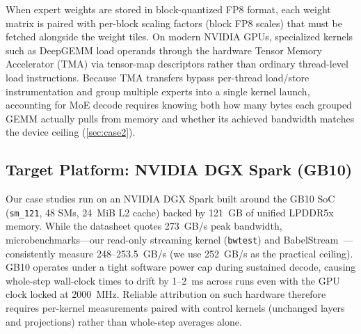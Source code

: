 When expert weights are stored in block-quantized FP8 format, each weight matrix is paired
with per-block scaling factors (block FP8 scales) that must be fetched alongside the weight
tiles.
On modern NVIDIA GPUs, specialized kernels such as DeepGEMM load operands through the
hardware Tensor Memory Accelerator (TMA) via tensor-map descriptors rather than ordinary
thread-level load instructions.
Because TMA transfers bypass per-thread load/store instrumentation and group multiple
experts into a single kernel launch, accounting for MoE decode requires knowing both how
many bytes each grouped GEMM actually pulls from memory and whether its achieved bandwidth
matches the device ceiling (\cref{sec:case2}).

\subsection{Target Platform: NVIDIA DGX Spark (GB10)}

Our case studies run on an NVIDIA DGX Spark built around the GB10 SoC
(\texttt{sm\_121}, 48 SMs, 24~MiB L2 cache) backed by 121~GB of unified LPDDR5x memory.
While the datasheet quotes 273~GB/s peak bandwidth, microbenchmarks---our read-only
streaming kernel (\texttt{bwtest}) and BabelStream~\cite{deakin2016babelstream}---consistently
measure 248--253.5~GB/s (we use 252~GB/s as the practical ceiling).
GB10 operates under a tight software power cap during sustained decode, causing whole-step
wall-clock times to drift by 1--2~ms across runs even with the GPU clock locked at 2000~MHz.
Reliable attribution on such hardware therefore requires per-kernel measurements paired with
control kernels (unchanged layers and projections) rather than whole-step averages alone.
